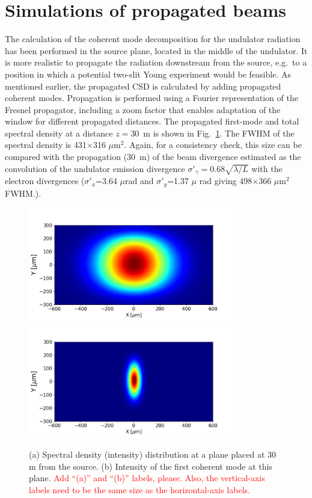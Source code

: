 \documentclass[%
 reprint,
 amsmath,amssymb,
 aps,
]{revtex4-1}
\begin{document}
\section{Simulations of propagated beams}

The calculation of the coherent mode decomposition for the undulator radiation has been performed in the source plane, located in the middle of the undulator. It is more realistic to propagate the radiation downstream from the source, e.g.~to a position in which a potential two-slit Young experiment would be feasible. As mentioned earlier, the propagated CSD is calculated by adding  propagated coherent modes. Propagation is performed using a Fourier representation of the Fresnel propagator, including a zoom factor \cite{schmidt,pirro} that enables adaptation of the window for different propagated distances. The propagated first-mode and total spectral density at a distance $z=30$~m is shown in Fig.~\ref{spectral_density_propagated}. The FWHM of the spectral density is 431$\times$316 $\mu$m$^2$. Again, for a consistency check, this size can be compared with the propagation (30~m) of the beam divergence estimated as the convolution of the undulator emission divergence $\sigma'_\gamma=0.68\sqrt{\lambda/L}$ with the electron divergences ($\sigma'_x$=3.64 $\mu$rad and $\sigma'_y$=1.37 $\mu$ rad giving 498$\times$366 $\mu$m$^2$ FWHM.). 

\begin{figure}
\includegraphics[width=9.0cm]{Figures/spectral_density_upto1099_propagated.png}
\includegraphics[width=9.0cm]{Figures/spectral_density_upto0_propagated.png}
\caption{(a) Spectral density (intensity) distribution at a plane placed at 30 m from the source. (b) Intensity of the first coherent mode at this plane. \textcolor{red}{Add ``(a)'' and ``(b)'' labels, please.  Also, the vertical-axis labels need to be the same size as the horizontal-axis labels.}}
\label{spectral_density_propagated}%
\end{figure}
\end{document}
